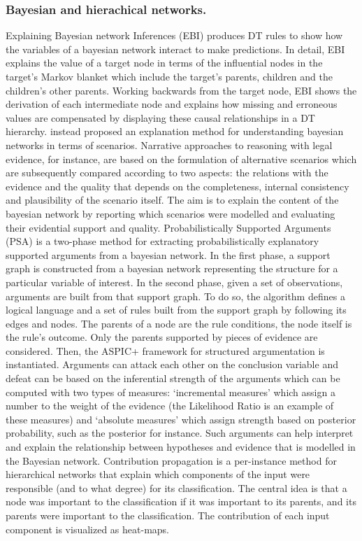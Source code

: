 \documentclass[final,1p,times]{elsarticle}
\begin{document}
\subsubsection{Bayesian and hierachical networks.} Explaining Bayesian network Inferences (EBI) \cite{yap2008explaining} produces DT rules to show how the variables of a bayesian network interact to make predictions. In detail, EBI explains the value of a target node in terms of the influential nodes in the target’s Markov blanket which include the target’s parents, children and the children’s other parents. Working backwards from the target node, EBI shows the derivation of each intermediate node and explains how missing and erroneous values are compensated by displaying these causal relationships in a DT hierarchy.
\cite{vlek2016method} instead proposed an explanation method for understanding bayesian networks in terms of scenarios. Narrative approaches to reasoning with legal evidence, for instance, are based on the formulation of alternative scenarios which are subsequently compared according to two aspects: the relations with the evidence and the quality that depends on the completeness, internal consistency and plausibility of the scenario itself. The aim is to explain the content of the bayesian network by reporting which scenarios were modelled and evaluating their evidential support and quality.
Probabilistically Supported Arguments (PSA) \cite{timmer2017two} is a two-phase method for extracting probabilistically explanatory supported arguments from a bayesian network. In the first phase, a support graph is constructed from a bayesian network representing the structure for a particular variable of interest. In the second phase, given a set of observations, arguments are built from that support graph. To do so, the algorithm defines a logical language and a set of rules built from the support graph by following its edges and nodes. The parents of a node are the rule conditions, the node itself is the rule's outcome. Only the parents supported by pieces of evidence are considered. Then, the ASPIC+ framework for structured argumentation is instantiated. Arguments can attack each other on the conclusion variable and defeat can be based on the inferential strength of the arguments which can be computed with two types of measures: `incremental measures' which assign a number to the weight of the evidence (the Likelihood Ratio is an example of these measures) and `absolute measures' which assign strength based on posterior probability, such as the posterior for instance. 
Such arguments can help interpret and explain the relationship between hypotheses and evidence that is modelled in the Bayesian network.
Contribution propagation \cite{Landecker2013interpreting} is a per-instance method for hierarchical networks that explain which components of the input were responsible (and to what degree) for its classification. The central idea is that a node was important to the classification if it was important to its parents, and its parents were important to the classification. The contribution of each input component is visualized as heat-maps.
\end{document}
